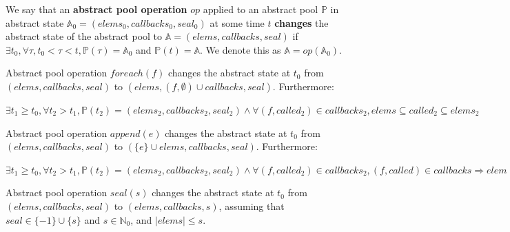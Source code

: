 \documentclass[runningheads,a4paper]{llncs}
\begin{document}
\begin{definition}
We say that an \textbf{abstract pool operation} $op$ applied to an
abstract pool $\mathbb{P}$ in abstract state $\mathbb{A}_0 = (elems_0, callbacks_0, seal_0)$ 
at some time $t$ \textbf{changes} the abstract state of the abstract pool to $\mathbb{A} = (elems, callbacks, seal)$ 
if $\exists t_0, \forall \tau, t_0 < \tau < t, \mathbb{P}(\tau) = \mathbb{A}_0$
and $\mathbb{P}(t) = \mathbb{A}$.
We denote this as $\mathbb{A} = op(\mathbb{A}_0)$.

Abstract pool operation $foreach(f)$ changes the abstract state at $t_0$ from $(elems, callbacks, seal)$ 
to $(elems, (f, \emptyset) \cup callbacks, seal)$. Furthermore:

$\exists t_1 \geq t_0, \forall t_2 > t_1, \mathbb{P}(t_2) = (elems_2,
callbacks_2, seal_2) \wedge \forall (f, called_2) \in callbacks_2,
elems \subseteq called_2 \subseteq elems_2$

Abstract pool operation $append(e)$ changes the abstract state at $t_0$ from
$(elems, callbacks, seal)$ to $(\{e\} \cup elems, callbacks, seal)$. Furthermore:

$\exists t_1 \geq t_0, \forall t_2 > t_1, \mathbb{P}(t_2) = (elems_2,
callbacks_2, seal_2) \wedge \forall (f, called_2) \in callbacks_2,
(f, called) \in callbacks \Rightarrow elem \in called_2$

Abstract pool operation $seal(s)$ changes the abstract state at $t_0$ from
$(elems, callbacks, seal)$ to $(elems, callbacks, s)$, assuming
that $seal \in \{-1\} \cup \{s\}$ and $s \in \mathbb{N}_0$, and
$|elems| \leq s$.
\end{definition}
\end{document}
